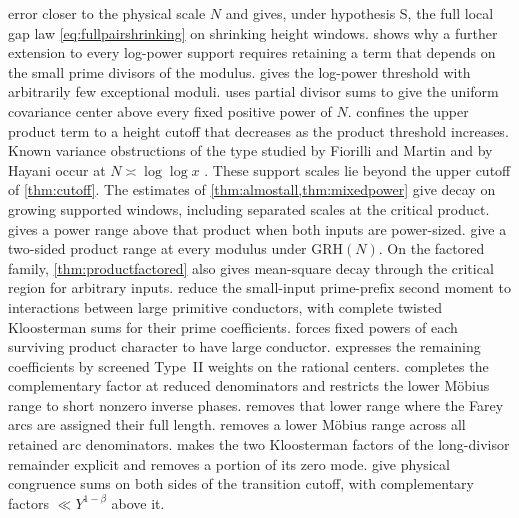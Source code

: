 \documentclass[11pt,a4paper]{article}
\numberwithin{equation}{section}
\newcommand{\grh}{\mathrm{GRH}}
\begin{document}
error closer to the physical scale $N$ and gives, under
hypothesis S, the full local gap law
\eqref{eq:fullpairshrinking} on shrinking height windows.
 shows why a further extension
to every log-power support requires retaining a term
that depends on the small prime divisors of the modulus.
 gives the log-power
threshold with arbitrarily few exceptional moduli.
 uses partial divisor sums to give the
uniform covariance center above every fixed positive power of $N$.
 confines the upper product term to
a height cutoff that decreases as the product threshold increases.
Known variance obstructions of the type studied by Fiorilli and
Martin and by Hayani occur at $N\asymp\log\log x$
\cite{FiorilliMartin,Hayani}. These support scales lie beyond
the upper cutoff of \cref{thm:cutoff}.
The estimates of \cref{thm:almostall,thm:mixedpower} give decay
on growing supported windows, including separated scales at
the critical product.  gives a power range
above that product when both inputs are power-sized.
 give a two-sided
product range at every modulus under $\grh(N)$.
On the factored family, \cref{thm:productfactored} also gives
mean-square decay through the critical region for arbitrary inputs.
reduce the small-input prime-prefix second moment to interactions
between large primitive conductors, with complete twisted
Kloosterman sums for their prime coefficients.
 forces fixed powers of
each surviving product character to have large conductor.
 expresses the remaining
coefficients by screened Type~II weights on the rational centers.
 completes the complementary
factor at reduced denominators and restricts the lower
M\"obius range to short nonzero inverse phases.
 removes that lower range
where the Farey arcs are assigned their full length.
 removes a lower
M\"obius range across all retained arc denominators.
 makes the two
Kloosterman factors of the long-divisor remainder
explicit and removes a portion of its zero mode.
give physical congruence sums on both sides of the
transition cutoff, with complementary factors $\ll Y^{1-\beta}$
above it.
\end{document}
